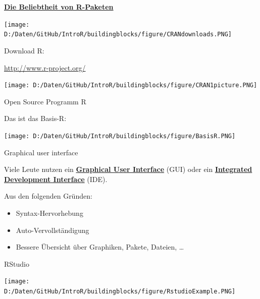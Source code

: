 \documentclass[ignorenonframetext,]{beamer}
\providecommand{\tightlist}{%
  \setlength{\itemsep}{0pt}\setlength{\parskip}{0pt}}
\begin{document}
\begin{frame}{\href{https://gallery.shinyapps.io/cran-gauge/}{\textbf{Die
Beliebtheit von R-Paketen}}}

\texttt{[image: D:/Daten/GitHub/IntroR/buildingblocks/figure/CRANdownloads.PNG]}

\end{frame}

\begin{frame}{Download R:}

\url{http://www.r-project.org/}

\texttt{[image: D:/Daten/GitHub/IntroR/buildingblocks/figure/CRAN1picture.PNG]}

\end{frame}

\begin{frame}{Open Source Programm R}

\begin{block}{Das ist das Basis-R:}

\texttt{[image: D:/Daten/GitHub/IntroR/buildingblocks/figure/BasisR.PNG]}

\end{block}

\end{frame}

\begin{frame}{Graphical user interface}

Viele Leute nutzen ein
\href{https://en.wikipedia.org/wiki/Graphical_user_interface}{\textbf{Graphical
User Interface}} (GUI) oder ein
\href{https://en.wikipedia.org/wiki/Integrated_development_environment}{\textbf{Integrated
Development Interface}} (IDE).

Aus den folgenden Gründen:

\begin{itemize}
\tightlist
\item
  Syntax-Hervorhebung
\item
  Auto-Vervollständigung
\item
  Bessere Übersicht über Graphiken, Pakete, Dateien, \ldots{}
\end{itemize}

\end{frame}

\begin{frame}{RStudio}

\texttt{[image: D:/Daten/GitHub/IntroR/buildingblocks/figure/RstudioExample.PNG]}

\end{frame}
\end{document}
